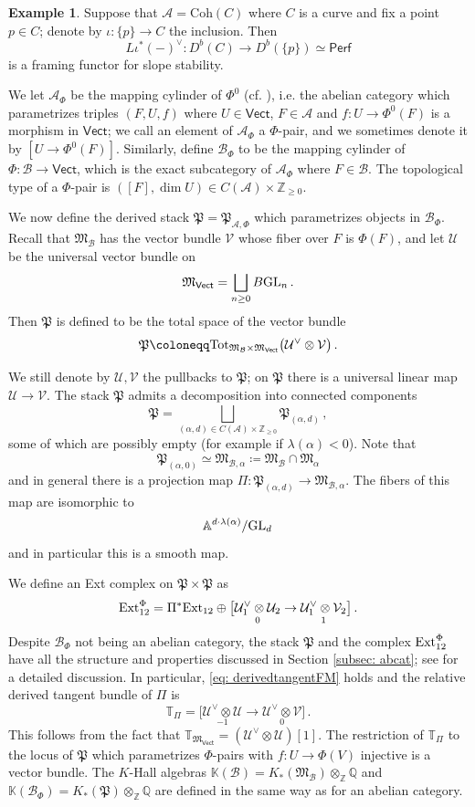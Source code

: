 \documentclass[12pt]{amsart}
\theoremstyle{definition}
\newtheorem{example}[definition]{Example}
\newcommand{\Vect}{\mathsf{Vect}}
\newcommand{\BA}{{\mathbb{A}}}
\newcommand{\BK}{{\mathbb{K}}}
\newcommand{\BQ}{{\mathbb{Q}}}
\newcommand{\BT}{{\mathbb{T}}}
\newcommand{\BZ}{{\mathbb{Z}}}
\newcommand{\CA}{{\mathcal A}}
\newcommand{\CB}{{\mathcal B}}
\newcommand{\CU}{{\mathcal U}}
\newcommand{\CV}{{\mathcal V}}
\newcommand{\1}{\mathbf 1}
\newcommand{\FP}{{\mathfrak{P}}}
\newcommand{\FM}{{\mathfrak{M}}}
\newcommand{\Ext}{\mathcal{E}\text{xt}}
\newcommand{\GL}{{\rm GL}}
\newcommand{\Coh}{\mathrm{Coh}}
\newcommand{\Perf}{\mathsf{Perf}}
\renewcommand{\Ext}{\textup{Ext}}
\begin{document}
\begin{example}
    Suppose that $\CA=\Coh(C)$ where $C$ is a curve and fix a point $p\in C$; denote by $\iota\colon \{p\}\to C$ the inclusion. Then
    \[L\iota^\ast(-)^\vee\colon D^b(C)\to D^b(\{p\})\simeq \Perf \]
    is a framing functor for slope stability.
\end{example}

We let $\CA_\Phi$ be the mapping cylinder of $\Phi^0$ (cf. \cite{mozgovoyquiverrepab}), i.e. the abelian category which parametrizes triples $(F, U, f)$ where $U\in \Vect$, $F\in \CA$ and $f\colon U\to \Phi^0(F)$ is a morphism in $\Vect$; we call an element of $\CA_\Phi$ a $\Phi$-pair, and we sometimes denote it by $[U\to \Phi^0(F)]$. Similarly, define $\CB_\Phi$ to be the mapping cylinder of $\Phi\colon \CB\to \Vect$, which is the exact subcategory of $\CA_\Phi$ where $F\in \CB$. The topological type of a $\Phi$-pair is $([F], \dim U)\in C(\CA)\times \BZ_{\geq 0}$.

We now define the derived stack $\FP=\FP_{\CA, \Phi}$ which parametrizes objects in $\CB_\Phi$. Recall that $\FM_{\CB}$ has the vector bundle $\CV$ whose fiber over $F$ is $\Phi(F)$, and let $\CU$ be the universal vector bundle on
\[\FM_\Vect=\bigsqcup_{n\geq 0}B\GL_n\,.\]
Then $\FP$ is defined to be the total space of the vector bundle
\[\FP\coloneqq \textup{Tot}_{\FM_\CB\times \FM_{\Vect}}\big(\CU^\vee\otimes \CV\big)\,.\]

We still denote by $\CU, \CV$ the pullbacks to $\FP$; on $\FP$ there is a universal linear map $\CU\to \CV$. The stack $\FP$ admits a decomposition into connected components
\[\FP=\bigsqcup_{(\alpha, d)\in C(\CA)\times \BZ_{\geq 0}} \FP_{(\alpha, d)}\,,\]
some of which are possibly empty (for example if $\lambda(\alpha)<0$). Note that 
\[\FP_{(\alpha, 0)}\simeq \FM_{\CB, \alpha}\coloneqq \FM_\CB \cap \FM_\alpha\] and in general there is a projection map $\Pi\colon \FP_{(\alpha, d)}\to \FM_{\CB, \alpha}$. The fibers of this map are isomorphic to
\[\BA^{d\cdot \lambda(\alpha)}/\GL_d\,\]
and in particular this is a smooth map.

We define an Ext complex on $\FP\times \FP$ as
\begin{equation}
    \label{eq: extPhi}\Ext_{12}^\Phi=\Pi^\ast \Ext_{12}\oplus \big[\underset{0}{\CU_1^\vee\otimes \CU_2}\to \underset{1}{\CU_1^\vee\otimes \CV_2}\big]\,.
    \end{equation}
Despite $\CB_\Phi$ not being an abelian category, the stack $\FP$ and the complex $\Ext_{12}^\Phi$ have all the structure and properties discussed in Section \ref{subsec: abcat}; see \cite[Section 5.2]{joyce} for a detailed discussion. In particular, \eqref{eq: derivedtangentFM} holds and the relative derived tangent bundle of $\Pi$ is
\[\BT_{\Pi}=\big[\underset{-1}{\CU^\vee\otimes \CU}\to \underset{0}{\CU^\vee\otimes \CV}\big]\,.\]
This follows from the fact that $\BT_{\FM_\Vect}=(\CU^\vee\otimes \CU)[1]$. The restriction of $\BT_\Pi$ to the locus of $\FP$ which parametrizes $\Phi$-pairs with $f\colon U\to \Phi(V)$ injective is a vector bundle. The $K$-Hall algebras $\BK(\CB)=K_\ast(\FM_\CB)\otimes_\BZ \BQ$ and $\BK(\CB_\Phi)=K_\ast(\FP)\otimes_\BZ \BQ$ are defined in the same way as for an abelian category.
\end{document}
